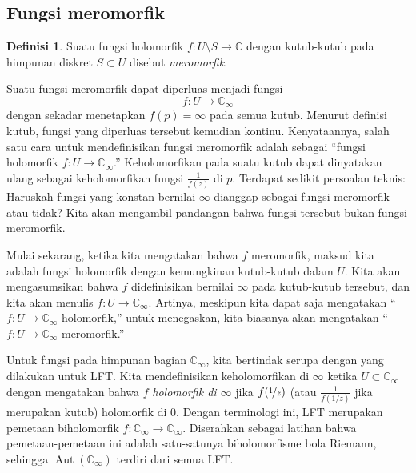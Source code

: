 \documentclass[12pt,openany]{book}
\newcommand{\Aut}{\operatorname{Aut}}
\newcommand{\C}{{\mathbb{C}}}
\newcommand{\myindex}[1]{#1\index{#1}}
\newcommand{\myquote}[1]{``#1''}
\theoremstyle{plain}
\theoremstyle{remark}
\theoremstyle{definition}
\newtheorem{defn}[thm]{Definisi}
\theoremstyle{exercise}
\theoremstyle{example}
\begin{document}
\subsection{Fungsi meromorfik}
\label{subsec:meromorphic}

\begin{defn}
Suatu fungsi holomorfik $f \colon U \setminus S \to \C$ dengan kutub-kutub pada
himpunan diskret $S \subset U$ disebut \emph{\myindex{meromorfik}}.
\end{defn}

Suatu fungsi meromorfik dapat diperluas menjadi fungsi
\begin{equation*}
f \colon U \to \C_{\infty}
\end{equation*}
dengan sekadar menetapkan $f(p) = \infty$ pada semua kutub.
Menurut definisi kutub, fungsi yang diperluas tersebut kemudian kontinu.
Kenyataannya, salah satu cara untuk mendefinisikan
fungsi meromorfik adalah sebagai
\myquote{fungsi holomorfik $f \colon U \to \C_{\infty}$.}
Keholomorfikan pada suatu kutub dapat
dinyatakan ulang sebagai keholomorfikan fungsi $\frac{1}{f(z)}$ di $p$.
Terdapat sedikit persoalan teknis: Haruskah fungsi
yang konstan bernilai $\infty$ dianggap sebagai fungsi meromorfik atau tidak?
Kita akan mengambil pandangan bahwa fungsi tersebut bukan fungsi meromorfik.

Mulai sekarang, ketika kita mengatakan bahwa $f$
meromorfik, maksud kita adalah fungsi holomorfik dengan kemungkinan
kutub-kutub dalam $U$. Kita akan mengasumsikan bahwa $f$ didefinisikan bernilai $\infty$
pada kutub-kutub tersebut, dan
kita akan menulis $f \colon U \to \C_\infty$. Artinya, meskipun kita
dapat saja mengatakan \myquote{$f \colon U \to \C_\infty$ holomorfik,} untuk menegaskan,
kita biasanya akan mengatakan \myquote{$f \colon U \to \C_\infty$ meromorfik.}

Untuk fungsi pada himpunan bagian $\C_\infty$, kita bertindak serupa dengan
yang dilakukan untuk LFT.
Kita mendefinisikan keholomorfikan di $\infty$ ketika $U \subset
\C_\infty$ dengan mengatakan bahwa $f$ \emph{\myindex{holomorfik di $\infty$}}
jika $f(\nicefrac{1}{z})$ (atau $\frac{1}{f(1/z)}$ jika merupakan kutub)
holomorfik di $0$.
Dengan terminologi ini, LFT merupakan pemetaan biholomorfik $f \colon
\C_\infty \to \C_\infty$. Diserahkan sebagai latihan bahwa
pemetaan-pemetaan ini adalah satu-satunya biholomorfisme bola Riemann, sehingga
$\Aut(\C_\infty)$ terdiri dari semua LFT.
\end{document}
